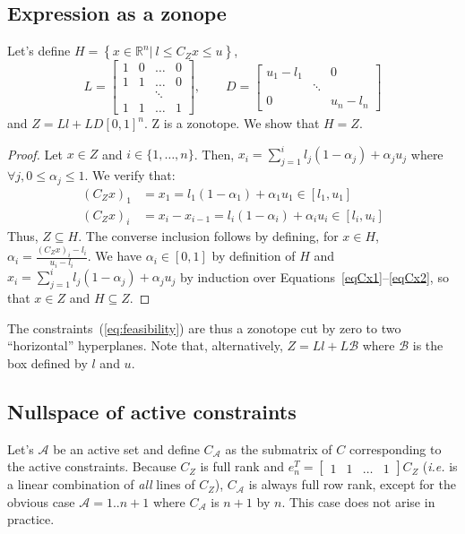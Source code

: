 \documentclass[]{article}
\newcommand{\BIN}{\begin{bmatrix}}
\newcommand{\BOUT}{\end{bmatrix}}
\begin{document}
\subsection{Expression as a zonope}
Let's define $H = \left\{x \in \mathbb{R}^n \vert\ l \leq C_Z x \leq u\right\}$, 
\begin{equation}
L = \BIN 1 & 0 & \ldots & 0 \\ 1 & 1 &\ldots & 0 \\ & & \ddots & \\ 1 & 1 &\ldots & 1\BOUT, \qquad D = \BIN u_1 - l_1 & & 0 \\ & \ddots & \\ 0 & & u_n - l_n\BOUT
\end{equation}
and $Z = Ll + LD \left[0,1\right]^n$. Z is a zonotope. We show that $H = Z$.
\begin{proof}
    Let $x \in Z$ and $i \in \{ 1, \ldots, n\}$. Then,
    $ x_i = \sum_{j=1}^i l_j (1 - \alpha_j) + \alpha_j u_j $
    where $\forall j, 0 \leq \alpha_j \leq 1$. We verify that:
    \begin{align}
        \label{eqCx1} (C_Z x)_1 & = x_1 = l_1 (1 - \alpha_1) + \alpha_1 u_1 \in [l_1, u_1] \\
        \label{eqCx2} (C_Z x)_i & = x_i - x_{i-1} = l_i (1 - \alpha_i) + \alpha_i u_i \in
        [l_i, u_i] 
    \end{align}
    Thus, $Z \subseteq H$. The converse inclusion follows by defining, for
    $x\in H$, $\alpha_i = \frac{(C_Z x)_i - l_i}{u_i - l_i}$. We have $\alpha_i
    \in [0, 1]$ by definition of $H$ and $x_i = \sum_{j=1}^i l_j (1 - \alpha_j)
    + \alpha_j u_j$ by induction over Equations~\eqref{eqCx1}--\eqref{eqCx2},
    so that $x \in Z$ and $H \subseteq Z$. 
\end{proof}
The constraints~(\ref{eq:feasibility}) are thus a zonotope cut by zero to two ``horizontal'' hyperplanes.
Note that, alternatively, $Z = Ll + L \mathcal{B}$ where $\mathcal{B}$ is the box defined by $l$ and $u$.

\subsection{Nullspace of active constraints}
Let's $\mathcal{A}$ be an active set and define $C_\mathcal{A}$ as the submatrix of $C$ corresponding to the active constraints.
Because $C_Z$ is full rank and $e_n^T = \BIN 1 & 1 & \ldots & 1 \BOUT C_Z$ (\emph{i.e.} is a linear combination of \emph{all} lines of $C_Z$), $C_\mathcal{A}$ is always full row rank, except for the obvious case $\mathcal{A} = 1..n+1$ where $C_\mathcal{A}$ is $n+1$ by $n$. This case does not arise in practice.
\end{document}
